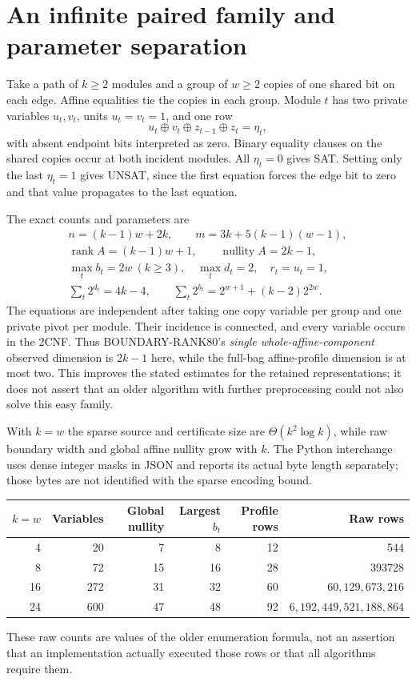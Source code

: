 \documentclass[11pt]{article}
\begin{document}
\section{An infinite paired family and parameter separation}
Take a path of $k\ge2$ modules and a group of $w\ge2$ copies of one shared bit on each edge. Affine equalities tie the copies in each group. Module $t$ has two private variables $u_t,v_t$, units $u_t=v_t=1$, and one row
\[
 u_t\oplus v_t\oplus z_{t-1}\oplus z_t=\eta_t,
\]
with absent endpoint bits interpreted as zero. Binary equality clauses on the shared copies occur at both incident modules. All $\eta_t=0$ gives SAT. Setting only the last $\eta_t=1$ gives UNSAT, since the first equation forces the edge bit to zero and that value propagates to the last equation.

The exact counts and parameters are
\begin{gather*}
 n=(k-1)w+2k,\qquad m=3k+5(k-1)(w-1),\\
 \operatorname{rank}A=(k-1)w+1,\qquad
 \operatorname{nullity}A=2k-1,\\
 \max_t b_t=2w\ (k\ge3),\quad \max_t d_t=2,\quad r_t=u_t=1,\\
 \sum_t2^{d_t}=4k-4,\qquad
 \sum_t2^{b_t}=2^{w+1}+(k-2)2^{2w}.
\end{gather*}
The equations are independent after taking one copy variable per group and one private pivot per module. Their incidence is connected, and every variable occurs in the 2CNF. Thus BOUNDARY-RANK80's \emph{single whole-affine-component} observed dimension is $2k-1$ here, while the full-bag affine-profile dimension is at most two. This improves the stated estimates for the retained representations; it does not assert that an older algorithm with further preprocessing could not also solve this easy family.

With $k=w$ the sparse source and certificate size are $\Theta(k^2\log k)$, while raw boundary width and global affine nullity grow with $k$. The Python interchange uses dense integer masks in JSON and reports its actual byte length separately; those bytes are not identified with the sparse encoding bound.

\begin{center}\begin{tabular}{rrrrrr}\toprule
$k=w$ & Variables & Global nullity & Largest $b_t$ & Profile rows & Raw rows\\\midrule
4 &20 &7 &8 &12 &544\\
8 &72 &15 &16 &28 &393728\\
16 &272 &31 &32 &60 &$60{,}129{,}673{,}216$\\
24 &600 &47 &48 &92 &$6{,}192{,}449{,}521{,}188{,}864$\\\bottomrule
\end{tabular}\end{center}
These raw counts are values of the older enumeration formula, not an assertion that an implementation actually executed those rows or that all algorithms require them.
\end{document}
